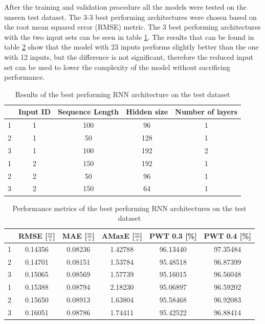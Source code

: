 After the training and validation procedure all the models were tested on the unseen test dataset. The 3-3 best performing architectures were chosen based on the root mean squared error (RMSE) metric. The 3 best performing architectures with the two input sets can be seen in table \ref{tab:rnn_best_models_1}. The results that can be found in table \ref{tab:rnn_best_models_1_metrics} show that the model with 23 inputs performs slightly better than the one with 12 inputs, but the difference is not significant, therefore the reduced input set can be used to lower the complexity of the model without sacrificing performance.
\FloatBarrier
\begin{table}[h]
    \centering
    \begin{tabular}{|c|c|c|c|c|}
        \hline
          & \textbf{Input ID} & \textbf{Sequence Length} & \textbf{Hidden size} & \textbf{Number of layers} \\
        \hline \hline
        1 & 1 & 100 & 96 & 1 \\
        \hline
        2 & 1 & 50 & 128 & 1 \\
        \hline
        3 & 1 & 100 & 192 & 2 \\
        \hline \hline
        1 & 2 & 150 & 192 & 1 \\
        \hline
        2 & 2 & 50 & 96 & 1 \\
        \hline
        3 & 2 & 150 & 64 & 1 \\
        \hline
    \end{tabular}
    \caption{Results of the best performing RNN architecture on the test dataset}
    \label{tab:rnn_best_models_1}
\end{table}
\FloatBarrier
\FloatBarrier
\begin{table}[h]
    \centering
    \begin{tabular}{|c|c|c|c|c|c|}
        \hline
          & \textbf{RMSE [$\frac{m}{s}$]} & \textbf{MAE [$\frac{m}{s}$]} & \textbf{AMaxE [$\frac{m}{s}$]} & \textbf{PWT 0.3 [\%]} & \textbf{PWT 0.4 [\%]} \\
        \hline \hline
        1 & 0.14356 & 0.08236 & 1.42788 & 96.13440 & 97.35484 \\
        \hline
        2 & 0.14701 & 0.08151 & 1.53784 & 95.48518 & 96.87399 \\
        \hline
        3 & 0.15065 & 0.08569 & 1.57739 & 95.16015 & 96.56048 \\
        \hline \hline
        1 & 0.15388 & 0.08794 & 2.18230 & 95.06897 & 96.59202 \\
        \hline
        2 & 0.15650 & 0.08913 & 1.63804 & 95.58468 & 96.92083 \\
        \hline
        3 & 0.16051 & 0.08786 & 1.74411 & 95.42522 & 96.88414 \\
        \hline
    \end{tabular}
    \caption{Performance metrics of the best performing RNN architectures on the test dataset}
    \label{tab:rnn_best_models_1_metrics}
\end{table}
